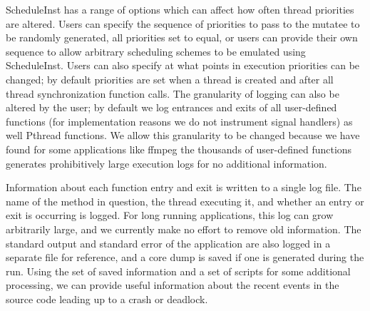 \documentclass[10pt,]{article} %
\begin{document}
	ScheduleInst has a range of options which can affect how often thread priorities are altered.  Users can specify the sequence of priorities to pass to the mutatee to be randomly generated, all priorities set to equal, or users can provide their own sequence to allow arbitrary scheduling schemes to be emulated using ScheduleInst.  Users can also specify at what points in execution priorities can be changed; by default priorities are set when a thread is created and after all thread synchronization function calls.  The granularity of logging can also be altered by the user; by default we log entrances and exits of all user-defined functions (for implementation reasons we do not instrument signal handlers) as well Pthread functions.  We allow this granularity to be changed because we have found for some applications like ffmpeg the thousands of user-defined functions generates prohibitively large execution logs for no additional information.    









Information about each function entry and exit is written to a single log file.  The name of the method in question, the thread executing it, and whether an entry or exit is occurring is logged.  For long running applications, this log can grow arbitrarily large, and we currently make no effort to remove old information.  The standard output and standard error of the application are also logged in a separate file for reference, and a core dump is saved if one is generated during the run.  Using the set of saved information and a set of scripts for some additional processing, we can provide useful information about the recent events in the source code leading up to a crash or deadlock.


\end{document}
